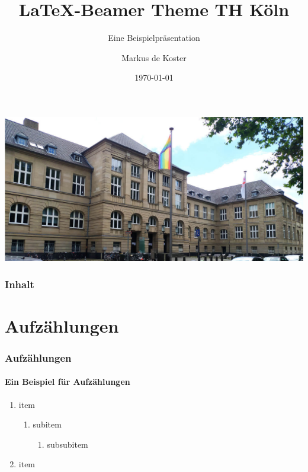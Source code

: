 \documentclass[aspectratio=169]{beamer}
\title{\LaTeX -Beamer Theme TH Köln}
\subtitle[Beispielpräsi]{Eine Beispielpräsentation}
\institute[TH Köln]{Technische Hochschule Köln}
\date[\ddmmyyyydate\today]{\today} %
\author{Markus de Koster}
\begin{document}
\begin{frame}
    \vspace{2em} %
    \begin{center}
    \includegraphics[width=.7\textwidth]{figures/thk.jpg}
    \end{center}
    \titlepage
\end{frame}

\begin{frame}
    \frametitle{Inhalt}
    \tableofcontents
\end{frame}

\section{Aufzählungen}\label{sec:enumerations} %
\begin{frame} 
    \frametitle{Aufzählungen} 
    \framesubtitle{Ein Beispiel für Aufzählungen} 
    \begin{enumerate} 
        \item item 
        \begin{enumerate} 
            \item subitem
            \begin{enumerate} 
                \item subsubitem
            \end{enumerate}
        \end{enumerate}
        \item item
    \end{enumerate}
\end{frame}
\end{document}
